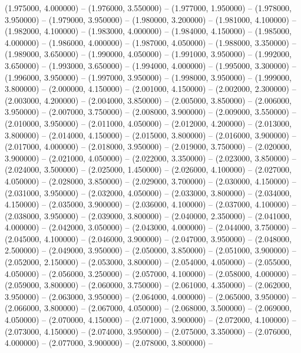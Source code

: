 (1.975000, 4.000000) -- 
(1.976000, 3.550000) -- 
(1.977000, 1.950000) -- 
(1.978000, 3.950000) -- 
(1.979000, 3.950000) -- 
(1.980000, 3.200000) -- 
(1.981000, 4.100000) -- 
(1.982000, 4.100000) -- 
(1.983000, 4.000000) -- 
(1.984000, 4.150000) -- 
(1.985000, 4.000000) -- 
(1.986000, 4.000000) -- 
(1.987000, 4.050000) -- 
(1.988000, 3.350000) -- 
(1.989000, 3.650000) -- 
(1.990000, 4.050000) -- 
(1.991000, 3.950000) -- 
(1.992000, 3.650000) -- 
(1.993000, 3.650000) -- 
(1.994000, 4.000000) -- 
(1.995000, 3.300000) -- 
(1.996000, 3.950000) -- 
(1.997000, 3.950000) -- 
(1.998000, 3.950000) -- 
(1.999000, 3.800000) -- 
(2.000000, 4.150000) -- 
(2.001000, 4.150000) -- 
(2.002000, 2.300000) -- 
(2.003000, 4.200000) -- 
(2.004000, 3.850000) -- 
(2.005000, 3.850000) -- 
(2.006000, 3.950000) -- 
(2.007000, 3.750000) -- 
(2.008000, 3.900000) -- 
(2.009000, 3.550000) -- 
(2.010000, 3.950000) -- 
(2.011000, 4.050000) -- 
(2.012000, 4.200000) -- 
(2.013000, 3.800000) -- 
(2.014000, 4.150000) -- 
(2.015000, 3.800000) -- 
(2.016000, 3.900000) -- 
(2.017000, 4.000000) -- 
(2.018000, 3.950000) -- 
(2.019000, 3.750000) -- 
(2.020000, 3.900000) -- 
(2.021000, 4.050000) -- 
(2.022000, 3.350000) -- 
(2.023000, 3.850000) -- 
(2.024000, 3.500000) -- 
(2.025000, 1.450000) -- 
(2.026000, 4.100000) -- 
(2.027000, 4.050000) -- 
(2.028000, 3.850000) -- 
(2.029000, 3.700000) -- 
(2.030000, 4.150000) -- 
(2.031000, 3.950000) -- 
(2.032000, 4.050000) -- 
(2.033000, 3.800000) -- 
(2.034000, 4.150000) -- 
(2.035000, 3.900000) -- 
(2.036000, 4.100000) -- 
(2.037000, 4.100000) -- 
(2.038000, 3.950000) -- 
(2.039000, 3.800000) -- 
(2.040000, 2.350000) -- 
(2.041000, 4.000000) -- 
(2.042000, 3.050000) -- 
(2.043000, 4.000000) -- 
(2.044000, 3.750000) -- 
(2.045000, 4.100000) -- 
(2.046000, 3.900000) -- 
(2.047000, 3.950000) -- 
(2.048000, 2.500000) -- 
(2.049000, 3.950000) -- 
(2.050000, 3.850000) -- 
(2.051000, 3.900000) -- 
(2.052000, 2.150000) -- 
(2.053000, 3.800000) -- 
(2.054000, 4.050000) -- 
(2.055000, 4.050000) -- 
(2.056000, 3.250000) -- 
(2.057000, 4.100000) -- 
(2.058000, 4.000000) -- 
(2.059000, 3.800000) -- 
(2.060000, 3.750000) -- 
(2.061000, 4.350000) -- 
(2.062000, 3.950000) -- 
(2.063000, 3.950000) -- 
(2.064000, 4.000000) -- 
(2.065000, 3.950000) -- 
(2.066000, 3.800000) -- 
(2.067000, 4.050000) -- 
(2.068000, 3.500000) -- 
(2.069000, 4.050000) -- 
(2.070000, 4.150000) -- 
(2.071000, 3.900000) -- 
(2.072000, 4.100000) -- 
(2.073000, 4.150000) -- 
(2.074000, 3.950000) -- 
(2.075000, 3.350000) -- 
(2.076000, 4.000000) -- 
(2.077000, 3.900000) -- 
(2.078000, 3.800000) -- 
